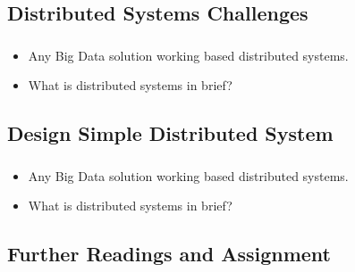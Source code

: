 

\subsection{Distributed Systems Challenges}
\begin{frame}
\frametitle{\subsecname}
\begin{itemize} 
	\item Any Big Data solution working based distributed systems.
	\item What is distributed systems in brief?
\end{itemize}
\end{frame}



\subsection{Design Simple Distributed System}
\begin{frame}
\frametitle{\subsecname}
\begin{itemize} 
	\item Any Big Data solution working based distributed systems.
	\item What is distributed systems in brief?
\end{itemize}
\end{frame}



\subsection{Further Readings and Assignment}

